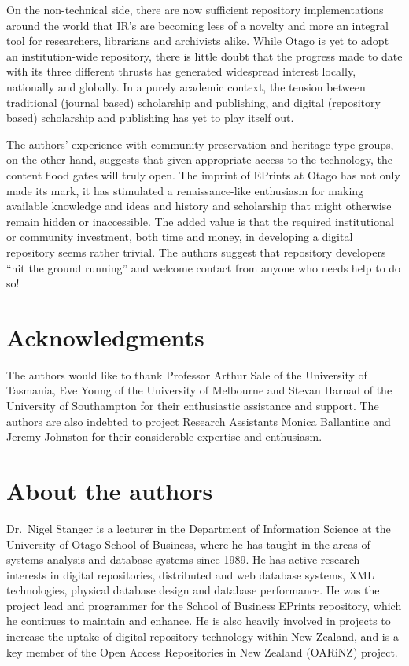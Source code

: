 \documentclass[12pt,pdftex,a4paper,titlepage]{article}
\begin{document}
On the non-technical side, there are now sufficient repository implementations around the world that IR's are becoming less of a novelty and more an integral tool for researchers, librarians and archivists alike. While Otago is yet to adopt an institution-wide repository, there is little doubt that the progress made to date with its three different thrusts has generated widespread interest locally, nationally and globally. In a purely academic context, the tension between traditional (journal based) scholarship and publishing, and digital (repository based) scholarship and publishing has yet to play itself out.

The authors' experience with community preservation and heritage type groups, on the other hand, suggests that given appropriate access to the technology, the content flood gates will truly open. The imprint of EPrints at Otago has not only made its mark, it has stimulated a renaissance-like enthusiasm for making available knowledge and ideas and history and scholarship that might otherwise remain hidden or inaccessible. The added value is that the required institutional or community investment, both time and money, in developing a digital repository seems rather trivial.  The authors suggest that repository developers ``hit the ground running'' and welcome contact from anyone who needs help to do so!


\section*{Acknowledgments}

The authors would like to thank Professor Arthur Sale of the University of Tasmania, Eve Young of the University of Melbourne and Stevan Harnad of the University of Southampton for their enthusiastic assistance and support. The authors are also indebted to project Research Assistants Monica Ballantine and Jeremy Johnston for their considerable expertise and enthusiasm.





\section*{About the authors}

Dr.\ Nigel Stanger is a lecturer in the Department of Information Science at the University of Otago School of Business, where he has taught in the areas of systems analysis and database systems since 1989. He has active research interests in digital repositories, distributed and web database systems, XML technologies, physical database design and database performance. He was the project lead and programmer for the School of Business EPrints repository, which he continues to maintain and enhance. He is also heavily involved in projects to increase the uptake of digital repository technology within New Zealand, and is a key member of the Open Access Repositories in New Zealand (OARiNZ) project.
\end{document}
